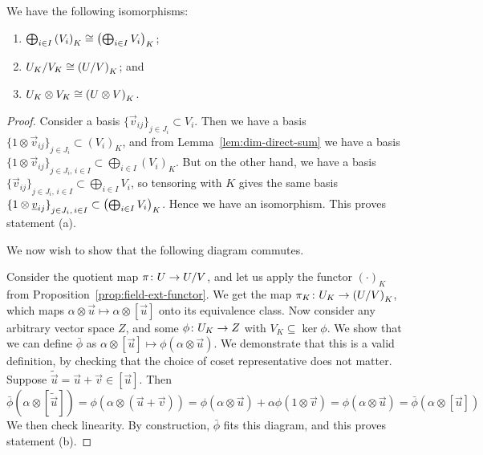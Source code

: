 \begin{proposition}
    We have the following isomorphisms:
    \begin{enumerate}[label={(\alph*)}, itemsep=0mm]
        \item \(\bigoplus_{i \in I} {(V_i)}_K \cong \pqty{\bigoplus_{i \in I} V_i}_K\);
        \item \(U_K/V_K \cong \pqty{U/V}_K\); and
        \item \(U_K \otimes V_K \cong \pqty{U \otimes V}_K\).
    \end{enumerate}
\end{proposition}
\begin{proof}
    Consider a basis \({\{\vec{v}_{ij}\}}_{j \in J_i} \subset V_i\).
    Then we have a basis \({\{1\otimes\vec{v}_{ij}\}}_{j \in J_i} \subset {(V_i)}_K\),
    and from Lemma~\ref{lem:dim-direct-sum} we have a basis
    \({\{1\otimes\vec{v}_{ij}\}}_{j \in J_i,\,i \in I} \subset \bigoplus_{i \in I} {(V_i)}_K\).
    But on the other hand, we have a basis
    \({\{\vec{v}_{ij}\}}_{j \in J_i,\,i \in I} \subset \bigoplus_{i \in I} V_i\),
    so tensoring with \(K\) gives the same basis
    \({\{1\otimes\vec{v}_{ij}\}}_{j \in J_i,\,i \in I} \subset \pqty{\bigoplus_{i \in I} V_i}_K\).
    Hence we have an isomorphism.
    This proves statement (a).

    We now wish to show that the following diagram commutes.
    \begin{center}
    \end{center}
    Consider the quotient map \(\pi\colon U\to U/V\),
    and let us apply the functor \({(\cdot)}_K\) from Proposition~\ref{prop:field-ext-functor}.
    We get the map \(\pi_K\colon U_K\to{(U/V)}_K\),
    which maps \(\alpha\otimes\vec{u} \mapsto \alpha\otimes[\vec{u}]\) onto its equivalence class.
    Now consider any arbitrary vector space \(Z\),
    and some \(\phi\colon U_K\to Z\) with \(V_K \subseteq \ker\phi\).
    We show that we can define \(\bar{\phi}\) as
    \(\alpha\otimes[\vec{u}] \mapsto \phi(\alpha\otimes\vec{u})\).
    We demonstrate that this is a valid definition,
    by checking that the choice of coset representative does not matter.
    Suppose \(\tilde{\vec{u}} = \vec{u}+\vec{v} \in [\vec{u}]\). Then
    \begin{equation*}
        \bar{\phi}(\alpha\otimes[\tilde{\vec{u}}])
        = \phi(\alpha\otimes(\vec{u}+\vec{v}))
        = \phi(\alpha\otimes\vec{u}) + \alpha\phi(1\otimes\vec{v})
        = \phi(\alpha\otimes\vec{u})
        = \bar{\phi}(\alpha\otimes[\vec{u}])
    \end{equation*}
    We then check linearity.
    By construction, \(\bar{\phi}\) fits this diagram,
    and this proves statement (b).


\end{proof}
